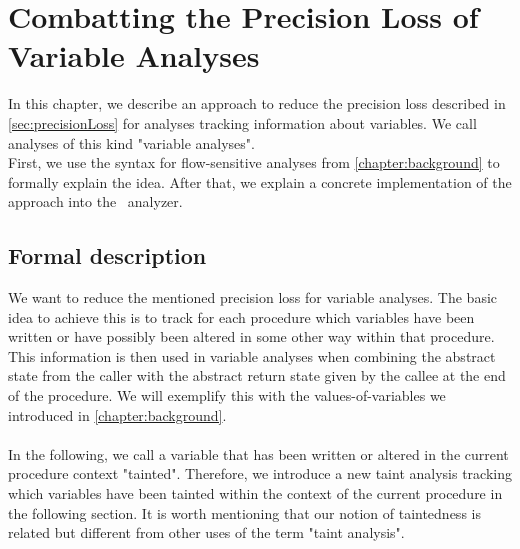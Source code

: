 
\chapter{Combatting the Precision Loss of Variable Analyses}\label{chapter:precisionLossVariableAnalyses}
  In this chapter, we describe an approach to reduce the precision loss described in \autoref{sec:precisionLoss} for analyses tracking information about variables. We call analyses of this kind "variable analyses".\\
  First, we use the syntax for flow-sensitive analyses from \autoref{chapter:background} to formally explain the idea. After that, we explain a concrete implementation of the approach into the \gob\ analyzer.
  \section{Formal description}
  We want to reduce the mentioned precision loss for variable analyses. The basic idea to achieve this is to track for each procedure which variables have been written or have possibly been altered in some other way within that procedure. This information is then used in variable analyses when combining the abstract state from the caller with the abstract return state given by the callee at the end of the procedure. We will exemplify this with the values-of-variables we introduced in \autoref{chapter:background}.\\
  \\
  In the following, we call a variable that has been written or altered in the current procedure context "tainted". Therefore, we introduce a new taint analysis tracking which variables have been tainted within the context of the current procedure in the following section. It is worth mentioning that our notion of taintedness is related but different from other uses of the term "taint analysis".\\
